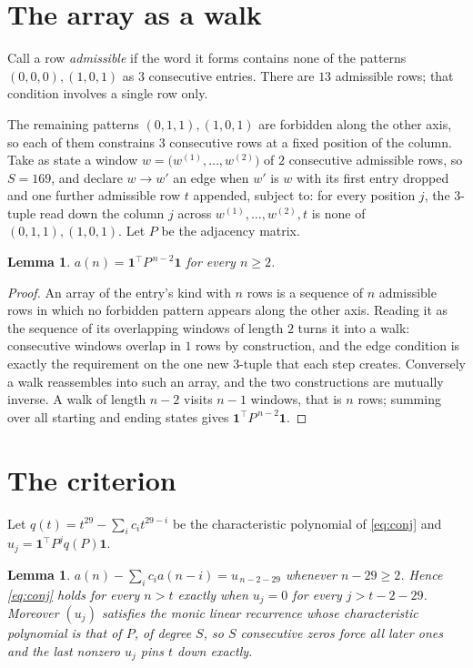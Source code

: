 \documentclass[11pt,a4paper]{article}
\theoremstyle{plain}
\newtheorem{lemma}[theorem]{Lemma}
\theoremstyle{definition}
\begin{document}
\section{The array as a walk}

Call a row \emph{admissible} if the word it forms contains none of the patterns
$(0,0,0), (1,0,1)$ as $3$ consecutive entries. There are $13$ admissible rows; that condition
involves a single row only.

The remaining patterns $(0,1,1), (1,0,1)$ are forbidden along the other axis, so each of them
constrains $3$ consecutive rows at a fixed position of the column. Take as state a
window $w=\bigl(w^{(1)},\dots,w^{(2)}\bigr)$ of $2$ consecutive admissible
rows, so $S=169$, and declare $w\to w'$ an edge when $w'$ is $w$ with its first entry
dropped and one further admissible row $t$ appended, subject to: for every position
$j$, the $3$-tuple read down the column $j$ across $w^{(1)},\dots,w^{(2)},t$
is none of $(0,1,1), (1,0,1)$. Let $P$ be the adjacency matrix.

\begin{lemma}\label{lem:walk}
$a(n)=\mathbf{1}^{\!\top}P^{\,n-2}\mathbf{1}$ for every $n\ge2$.
\end{lemma}

\begin{proof}
An array of the entry's kind with $n$ rows is a sequence of $n$ admissible rows in
which no forbidden pattern appears along the other axis. Reading it as the sequence of its
overlapping windows of length $2$ turns it into a walk: consecutive windows overlap in
$1$ rows by construction, and the edge condition is exactly the requirement on the one
new $3$-tuple that each step creates. Conversely a walk reassembles into such an array,
and the two constructions are mutually inverse. A walk of length $n-2$ visits $n-1$
windows, that is $n$ rows; summing over all starting and ending states gives
$\mathbf{1}^{\!\top}P^{\,n-2}\mathbf{1}$.
\end{proof}

\section{The criterion}

Let $q(t)=t^{29}-\sum_i c_i t^{29-i}$ be the characteristic polynomial of
\eqref{eq:conj} and $u_j=\mathbf{1}^{\!\top}P^{j}q(P)\mathbf{1}$.

\begin{lemma}\label{lem:crit}
$a(n)-\sum_i c_i a(n-i)=u_{\,n-2-29}$ whenever $n-29\ge2$. Hence
\eqref{eq:conj} holds for every $n>t$ exactly when $u_j=0$ for every
$j>t-2-29$. Moreover $(u_j)$ satisfies the monic linear recurrence whose
characteristic polynomial is that of $P$, of degree $S$, so $S$ consecutive zeros force all
later ones and the last nonzero $u_j$ pins $t$ down exactly.
\end{lemma}
\end{document}
